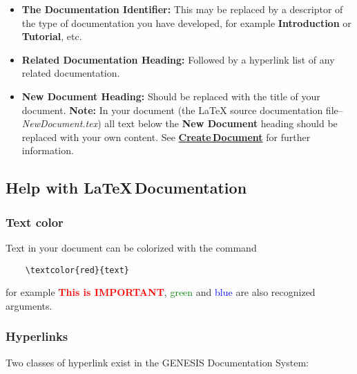 \documentclass[12pt]{article}
\begin{document}
\begin{itemize}
\item[]  {\bf The Documentation Identifier:} This may be replaced by a descriptor of the type of documentation you have developed, for example {\bf Introduction} or {\bf Tutorial}, etc.
\item[]{\bf Related Documentation Heading:} Followed by a hyperlink list of any related documentation.
\item[] {\bf New Document Heading:} Should be replaced with the title of your document. {\bf Note:} In your document (the \LaTeX\,\,source documentation file--{\it NewDocument.tex}) all text below the {\bf New Document} heading should be replaced with your own content. See \href{../document-create/document-create.tex}{\bf Create\,Document} for further information.
\end{itemize}

\subsection*{Help with \LaTeX\,Documentation}

\subsubsection*{Text color}

Text in your document can be colorized  with the command
\begin{verbatim}
    \textcolor{red}{text}
\end{verbatim}
for example \textcolor{red}{\bf This is IMPORTANT}, \textcolor{green}{green} and \textcolor{blue}{blue} are also recognized arguments.

\subsubsection*{Hyperlinks}

Two classes of hyperlink exist in the GENESIS Documentation System:
\end{document}

